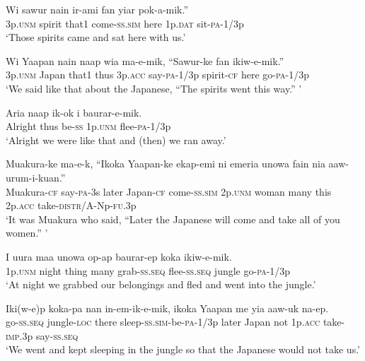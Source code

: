 \ea
\gll  Wi  sawur  nain  ir-ami  fan  yiar  pok-a-mik.” \\
3p.\textsc{unm}  spirit{{\footnotemark}} that1  come-\textsc{ss}.\textsc{sim}  here  1p.\textsc{dat}  sit-\textsc{pa}-1/3p \\
\glt ‘Those spirits came and sat here with us.’ \\
\z
{} 

\ea
\gll  Wi  Yaapan  nain  naap  wia  ma-e-mik,  “Sawur-ke       fan  ikiw-e-mik.” \\
3p.\textsc{unm}  Japan  that1  thus  3p.\textsc{acc}  say-\textsc{pa}-1/3p  spirit-\textsc{cf} here  go-\textsc{pa}-1/3p \\
\glt ‘We said like that about the Japanese, “The spirits went this way.” ’ \\
\z


\ea
\gll  Aria  naap  ik-ok  i  baurar-e-mik. \\
Alright  thus  be-\textsc{ss}  1p.\textsc{unm}  flee-\textsc{pa}-1/3p \\
\glt ‘Alright we were like that and (then) we ran away.’ \\
\z


\ea
\gll  Muakura-ke  ma-e-k,  ``Ikoka  Yaapan-ke  ekap-emi  ni       emeria  unowa  fain  nia  aaw-urum-i-kuan.” \\
Muakura-\textsc{cf}  say-\textsc{pa}-3s  later  Japan-\textsc{cf}  come-\textsc{ss}.\textsc{sim}  2p.\textsc{unm} woman  many  this  2p.\textsc{acc}  take-\textsc{distr}/A-Np-\textsc{fu}.3p \\
\glt ‘It was Muakura who said, “Later the Japanese will come and take all of you women.” ’ \\
\z


\ea
\gll  I  uura  maa  unowa  op-ap  baurar-ep  koka       ikiw-e-mik. \\
1p.\textsc{unm}  night  thing  many  grab-\textsc{ss.seq}  flee-\textsc{ss.seq}  jungle go-\textsc{pa}-1/3p \\
\glt ‘At night we grabbed our belongings and fled and went into the jungle.’ \\
\z


\ea
\gll  Iki(w-e)p  koka-pa  nan  in-em-ik-e-mik,       ikoka  Yaapan  me  yia  aaw-uk  na-ep. \\
go-\textsc{ss.seq}  jungle-\textsc{loc}  there  sleep-\textsc{ss}.\textsc{sim}-be-\textsc{pa}-1/3p later  Japan  not  1p.\textsc{acc}  take-\textsc{imp}.3p  say-\textsc{ss.seq} \\
\glt ‘We went and kept sleeping in the jungle so that the Japanese would not take us.’ \\
\z


